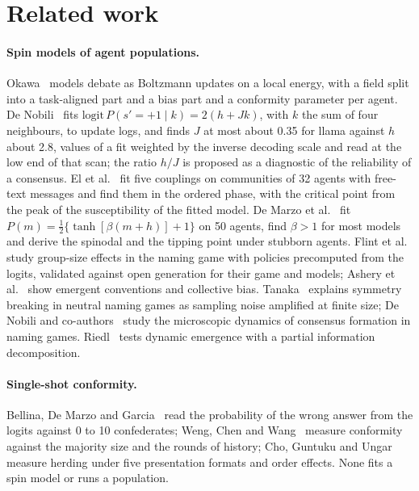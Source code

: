 \documentclass[11pt]{article}
\begin{document}
\section{Related work}

\paragraph{Spin models of agent populations.} Okawa~\cite{okawa2026} models
debate as Boltzmann updates on a local energy, with a field split into a
task-aligned part and a bias part and a conformity parameter per agent.
De Nobili~\cite{denobili2026} fits $\text{logit}\,P(s'=+1\mid k) =
2(h + Jk)$, with $k$ the sum of four neighbours, to update logs, and finds
$J$ at most about 0.35 for llama against $h$ about 2.8, values of a fit
weighted by the inverse decoding scale and read at the low end of that
scan; the ratio $h/J$ is proposed as a diagnostic of the reliability of a
consensus. El et
al.~\cite{el2026} fit five couplings on communities of 32 agents with
free-text messages and find them in the ordered phase, with the critical
point from the peak of the susceptibility of the fitted model. De Marzo et
al.~\cite{demarzo2026} fit $P(m) = \tfrac12\{\tanh[\beta(m+h)]+1\}$ on 50
agents, find $\beta>1$ for most models and derive the spinodal and the
tipping point under stubborn agents. Flint et al.~\cite{flint2026} study
group-size effects in the naming game with policies precomputed from the
logits, validated against open generation for their game and models; Ashery et al.~\cite{ashery2025}
show emergent conventions and collective bias. Tanaka~\cite{tanaka2026} explains symmetry breaking in neutral naming games as sampling noise amplified at finite size; De Nobili and co-authors~\cite{denobiling2026} study the microscopic dynamics of consensus formation in naming games. Riedl~\cite{riedl2026} tests dynamic emergence
with a partial information decomposition.

\paragraph{Single-shot conformity.} Bellina, De Marzo and
Garcia~\cite{bellina2026} read the probability of the wrong answer from
the logits against 0 to 10 confederates; Weng, Chen and
Wang~\cite{weng2025} measure conformity against the majority size and the
rounds of history; Cho, Guntuku and Ungar~\cite{cho2025} measure herding
under five presentation formats and order effects. None fits a spin model
or runs a population.
\end{document}
